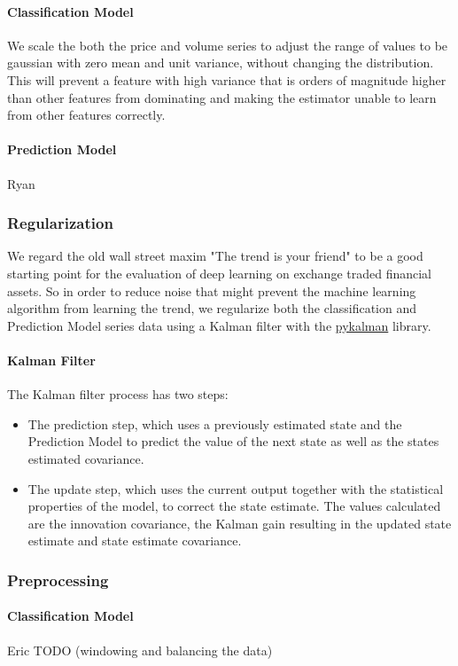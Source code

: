 \documentclass{article}
\begin{document}
\begin{multicols}{2}
\paragraph{Classification Model}
We scale the both the price and volume series to adjust the range of values to be gaussian with zero mean and unit variance, without changing the distribution. This will prevent a feature with high variance that is orders of magnitude higher than other features from dominating and making the estimator unable to learn from other features correctly.
\paragraph{Prediction Model}
Ryan

\subsubsection{Regularization}
We regard the old wall street maxim "The trend is your friend" to be a good starting point for the evaluation of deep learning on exchange traded financial assets. So in order to reduce noise that might prevent the machine learning algorithm from learning the trend, we regularize both the classification and Prediction Model series data using a Kalman filter with the \href{https://pykalman.github.io/}{pykalman} library.


\paragraph{Kalman Filter}
The Kalman filter process has two steps:
\begin{itemize}
\item The prediction step, which uses a previously estimated state and
  the Prediction Model to predict the value of the next state as well as
  the states estimated covariance.

\item The update step, which uses the current output together with the statistical properties of the model, to
  correct the state estimate. The values calculated are the innovation
  covariance, the Kalman gain resulting in the updated state estimate
  and state estimate covariance.
\end{itemize}


\subsubsection{Preprocessing}
\paragraph{Classification Model}
Eric TODO (windowing and balancing the data) \cite{4_website}

\end{multicols}
\end{document}
